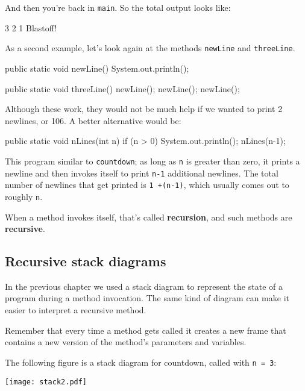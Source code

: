 \documentclass[12pt]{book}
\begin{document}
\noindent And then you're back in {\tt main}.
So the total output looks like:

\begin{stdout}
3
2
1
Blastoff!
\end{stdout}

As a second example, let's look again at the methods {\tt newLine} and {\tt threeLine}.

\begin{code}
    public static void newLine() {
        System.out.println();
    }

    public static void threeLine() {
        newLine();
        newLine();
        newLine();
    }
\end{code}

Although these work, they would not be much help if we wanted to print 2 newlines, or 106.
A better alternative would be:

\begin{code}
    public static void nLines(int n) {
        if (n > 0) {
            System.out.println();
            nLines(n-1);
        }
    }
\end{code}

This program similar to {\tt countdown}; as long as {\tt n} is greater than zero, it prints a newline and then invokes itself to print {\tt n-1} additional newlines.
The total number of newlines that get printed is {\tt 1 +(n-1)}, which usually comes out to roughly {\tt n}.


When a method invokes itself, that's called {\bf recursion}, and such methods are {\bf recursive}.

\subsection{Recursive stack diagrams}


In the previous chapter we used a stack diagram to represent the state of a program during a method invocation.
The same kind of diagram can make it easier to interpret a recursive method.

Remember that every time a method gets called it creates a new frame that contains a new version of the method's parameters and variables.

The following figure is a stack diagram for countdown, called with {\tt n = 3}:

\begin{center}
\texttt{[image: stack2.pdf]}
\end{center}
\end{document}
